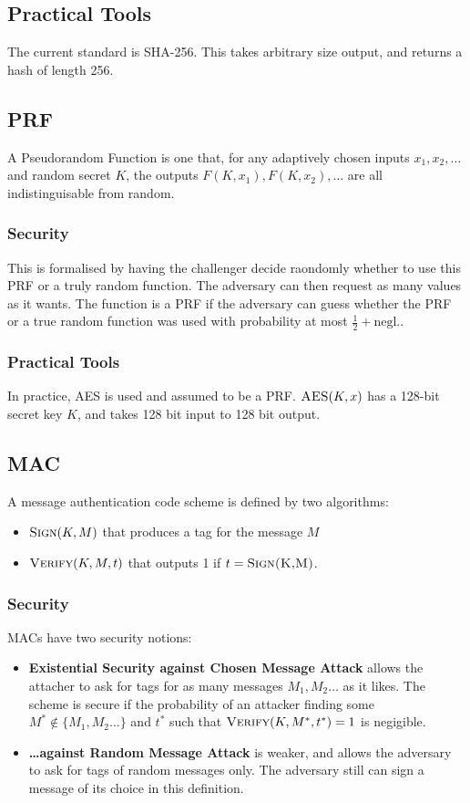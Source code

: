 \documentclass{article}
\begin{document}
\begin{multicols*}{2}
	\subsection{Practical Tools}
	The current standard is SHA-256. This takes arbitrary size output, and returns a hash of length 256.

	\subsection{PRF}
	A Pseudorandom Function is one that, for any adaptively chosen inputs $x_1, x_2,\ldots$ and random secret $K$, the outputs $F(K, x_1), F(K, x_2),\ldots$ are all indistinguisable from random. 

	\subsubsection{Security}
	This is formalised by having the challenger decide raondomly whether to use this PRF or a truly random function. The adversary can then request as many values as it wants. The function is a PRF if the adversary can guess whether the PRF or a true random function was used with probability at most $\frac{1}{2} + \text{negl.}$.

	\subsubsection{Practical Tools}
	In practice, AES is used and assumed to be a PRF. $\textsc{AES}(K, x)$ has a 128-bit secret key $K$, and takes 128 bit input to 128 bit output.


	\subsection{MAC}
	A message authentication code scheme is defined by two algorithms:
	\begin{itemize}[noitemsep, topsep=0pt]
		\item $\textsc{Sign}(K, M)$ that produces a tag for the message $M$
		\item $\textsc{Verify}(K, M, t)$ that outputs 1 if $t = \textsc{Sign(K,M)}$.
	\end{itemize}

	\subsubsection{Security}
	MACs have two security notions:
	\begin{itemize}[noitemsep, topsep=0pt]
	\item \textbf{Existential Security against Chosen Message Attack} allows the attacher to ask for tags for as many messages $M_1, M_2\ldots$ as it likes. The scheme is secure if the probability of an attacker finding some $M^* \notin \{M_1, M_2\ldots\}$ and $t^*$ such that $\textsc{Verify}(K, M^*, t^*) = 1$ is negigible.
	\item \textbf{\ldots against Random Message Attack} is weaker, and allows the adversary to ask for tags of random messages only. The adversary still can sign a message of its choice in this definition.
	\end{itemize}

\end{multicols*}
\end{document}

